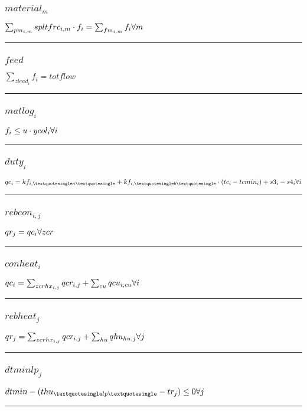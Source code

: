\documentclass[11pt]{article}
\begin{document}
\subsubsection*{$material_{m}$}
$
\sum_{pm_{i,m}} spltfrc_{i,m} \cdot f_{i} = \sum_{fm_{i,m}} f_{i}\hfill \forall m
$
\vspace{5pt}
\hrule
\subsubsection*{$feed$}
$
\sum_{zlead_{i}} f_{i} = totflow
$
\vspace{5pt}
\hrule
\subsubsection*{$matlog_{i}$}
$
f_{i} \leq u \cdot ycol_{i}\hfill \forall i
$
\vspace{5pt}
\hrule
\subsubsection*{$duty_{i}$}
$
qc_{i} = kf_{i,\textquotesingle a \textquotesingle} + kf_{i,\textquotesingle b \textquotesingle} \cdot (tc_{i} - tcmin_{i}) + s3_{i} - s4_{i}\hfill \forall i
$
\vspace{5pt}
\hrule
\subsubsection*{$rebcon_{i,j}$}
$
qr_{j} = qc_{i}\hfill \forall zcr
$
\vspace{5pt}
\hrule
\subsubsection*{$conheat_{i}$}
$
qc_{i} = \sum_{zcrhx_{i,j}} qcr_{i,j} + \sum_{cu} qcu_{i,cu}\hfill \forall i
$
\vspace{5pt}
\hrule
\subsubsection*{$rebheat_{j}$}
$
qr_{j} = \sum_{zcrhx_{i,j}} qcr_{i,j} + \sum_{hu} qhu_{hu,j}\hfill \forall j
$
\vspace{5pt}
\hrule
\subsubsection*{$dtminlp_{j}$}
$
dtmin - (thu_{\textquotesingle lp \textquotesingle} - tr_{j}) \leq 0\hfill \forall j
$
\vspace{5pt}
\hrule
\end{document}
